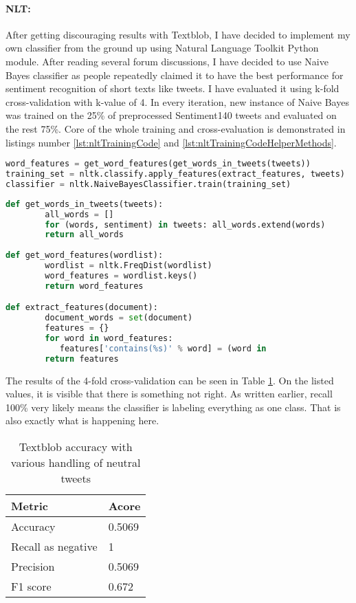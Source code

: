 
\paragraph{NLT:} After getting discouraging results with Textblob, I have decided to implement my own classifier from the ground up using Natural Language Toolkit Python module. After reading several forum discussions, I have decided to use Naive Bayes classifier as people repeatedly claimed it to have the best performance for sentiment recognition of short texts like tweets. I have evaluated it using k-fold cross-validation with k-value of 4. In every iteration, new instance of Naive Bayes was trained on the 25\% of preprocessed Sentiment140 tweets and evaluated on the rest 75\%. Core of the whole training and cross-evaluation is demonstrated in listings number \ref{lst:nltTrainingCode} and \ref{lst:nltTrainingCodeHelperMethods}.

\begin{lstlisting}[caption={Feature extraction and NLT classifier training},label={lst:nltTrainingCode},language=Python]
word_features = get_word_features(get_words_in_tweets(tweets))
training_set = nltk.classify.apply_features(extract_features, tweets)
classifier = nltk.NaiveBayesClassifier.train(training_set)
\end{lstlisting}    
\begin{lstlisting}[caption={Helper methods for text features extraction},label={lst:nltTrainingCodeHelperMethods},language=Python]
def get_words_in_tweets(tweets):
    	all_words = []
    	for (words, sentiment) in tweets: all_words.extend(words)
    	return all_words    
    
def get_word_features(wordlist):
    	wordlist = nltk.FreqDist(wordlist)
    	word_features = wordlist.keys()
    	return word_features

def extract_features(document):
    	document_words = set(document)
    	features = {}
    	for word in word_features:
           features['contains(%s)' % word] = (word in                                           		   document_words)
    	return features
\end{lstlisting}

The results of the 4-fold cross-validation can be seen in Table \ref{table:NLTmetrics}. On the listed values, it is visible that there is something not right. As written earlier, recall 100\% very likely means the classifier is labeling everything as one class. That is also exactly what is happening here.

\begin{table}[H]
\centering
\begin{tabular}{ |p{3cm}|p{3cm}|}
 \hline
\textbf{ Metric }& \textbf{Acore}\\
 \hline
 Accuracy   & 0.5069\\ \hline
 Recall as negative & 1\\ \hline
 Precision & 0.5069\\ \hline 
 F1 score & 0.672\\ \hline 
\end{tabular}
\caption{Textblob accuracy with various handling of neutral tweets}
\label{table:NLTmetrics}
\end{table}

